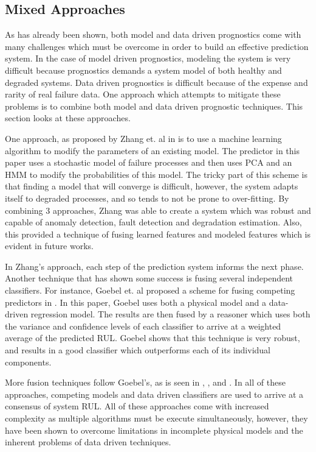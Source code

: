 \documentclass[12pt]{article}
\begin{document}
\subsection{Mixed Approaches}
As has already been shown, both model and data driven prognostics come
with many challenges which must be overcome in order to build an
effective prediction system.  In the case of model driven prognostics,
modeling the system is very difficult because prognostics demands a
system model of both healthy and degraded systems.  Data driven
prognostics is difficult because of the expense and rarity of real
failure data.  One approach which attempts to mitigate these problems
is to combine both model and data driven prognostic techniques.  This
section looks at these approaches.

One approach, as proposed by Zhang et. al in \cite{1470385} is to use
a machine learning algorithm to modify the parameters of an existing
model.  The predictor in this paper uses a stochastic model of failure
processes and then uses PCA and an HMM to modify the probabilities of
this model.  The tricky part of this scheme is that finding a model
that will converge is difficult, however, the system adapts itself to
degraded processes, and so tends to not be prone to over-fitting.  By
combining 3 approaches, Zhang was able to create a system which was
robust and capable of anomaly detection, fault detection and
degradation estimation.  Also, this provided a technique of fusing
learned features and modeled features which is evident in future
works.

In Zhang's approach, each step of the prediction system informs the
next phase.  Another technique that has shown some success is fusing
several independent classifiers.  For instance, Goebel et. al proposed
a scheme for fusing competing predictors in \cite{1656116}.  In this
paper, Goebel uses both a physical model and a data-driven regression
model.  The results are then fused by a reasoner which uses both the
variance and confidence levels of each classifier to arrive at a
weighted average of the predicted RUL.  Goebel shows that this
technique is very robust, and results in a good classifier which
outperforms each of its individual components.

More fusion techniques follow Goebel's, as is seen in \cite{6299507},
\cite{6113902}, and \cite{6024361}.  In all of these approaches,
competing models and data driven classifiers are used to arrive at a
consensus of system RUL.  All of these approaches come with increased
complexity as multiple algorithms must be execute simultaneously,
however, they have been shown to overcome limitations in incomplete
physical models and the inherent problems of data driven techniques.
\end{document}
